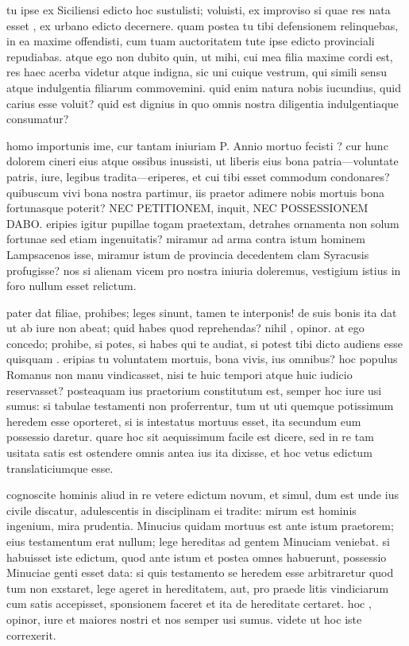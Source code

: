  tu ipse ex Siciliensi edicto hoc sustulisti; voluisti, ex improviso si quae res nata esset , ex urbano edicto decernere. quam postea tu tibi defensionem relinquebas, in ea maxime offendisti, cum tuam auctoritatem tute ipse edicto provinciali repudiabas. atque ego non dubito quin, ut mihi, cui mea filia maxime cordi est, res haec acerba videtur atque indigna, sic uni cuique vestrum, qui simili sensu atque indulgentia filiarum commovemini. quid enim natura nobis iucundius, quid carius esse voluit? quid est dignius in quo omnis nostra diligentia indulgentiaque consumatur?

 homo importunis ime, cur tantam iniuriam P. Annio mortuo fecisti ? cur hunc dolorem cineri eius atque ossibus inussisti, ut liberis eius bona patria—voluntate patris, iure, legibus tradita—eriperes, et cui tibi esset commodum condonares? quibuscum vivi bona nostra partimur, iis praetor adimere nobis mortuis bona fortunasque poterit? NEC PETITIONEM, inquit, NEC POSSESSIONEM DABO. eripies igitur pupillae togam praetextam, detrahes ornamenta non solum fortunae sed etiam ingenuitatis? miramur ad arma contra istum hominem Lampsacenos isse, miramur istum de provincia decedentem clam Syracusis profugisse? nos si alienam vicem pro nostra iniuria doleremus, vestigium istius in foro nullum esset relictum.

 pater dat filiae, prohibes; leges sinunt, tamen te interponis! de suis bonis ita dat ut ab iure non abeat; quid habes quod reprehendas? nihil , opinor. at ego concedo; prohibe, si potes, si habes qui te audiat, si potest tibi dicto audiens esse quisquam . eripias tu voluntatem mortuis, bona vivis, ius omnibus? hoc populus Romanus non manu vindicasset, nisi te huic tempori atque huic iudicio reservasset? posteaquam ius praetorium constitutum est, semper hoc iure usi sumus: si tabulae testamenti non proferrentur, tum ut uti quemque potissimum heredem esse oporteret, si is intestatus mortuus esset, ita secundum eum possessio daretur. quare hoc sit aequissimum facile est dicere, sed in re tam usitata satis est ostendere omnis antea ius ita dixisse, et hoc vetus edictum translaticiumque esse.

 cognoscite hominis aliud in re vetere edictum novum, et simul, dum est unde ius civile discatur, adulescentis in disciplinam ei tradite: mirum est hominis ingenium, mira prudentia. Minucius quidam mortuus est ante istum praetorem; eius testamentum erat nullum; lege hereditas ad gentem Minuciam veniebat. si habuisset iste edictum, quod ante istum et postea omnes habuerunt, possessio Minuciae genti esset data: si quis testamento se heredem esse arbitraretur quod tum non exstaret, lege ageret in hereditatem, aut, pro praede litis vindiciarum cum satis accepisset, sponsionem faceret et ita de hereditate certaret. hoc , opinor, iure et maiores nostri et nos semper usi sumus. videte ut hoc iste correxerit.

